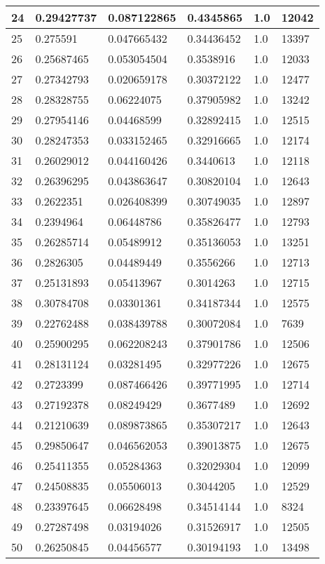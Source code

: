 \begin{longtable}{|l|l|l|l|l|l|}
24 & 0.29427737 & 0.087122865 & 0.4345865 & 1.0 & 12042 \\ \hline 
25 & 0.275591 & 0.047665432 & 0.34436452 & 1.0 & 13397 \\ \hline 
26 & 0.25687465 & 0.053054504 & 0.3538916 & 1.0 & 12033 \\ \hline 
27 & 0.27342793 & 0.020659178 & 0.30372122 & 1.0 & 12477 \\ \hline 
28 & 0.28328755 & 0.06224075 & 0.37905982 & 1.0 & 13242 \\ \hline 
29 & 0.27954146 & 0.04468599 & 0.32892415 & 1.0 & 12515 \\ \hline 
30 & 0.28247353 & 0.033152465 & 0.32916665 & 1.0 & 12174 \\ \hline 
31 & 0.26029012 & 0.044160426 & 0.3440613 & 1.0 & 12118 \\ \hline 
32 & 0.26396295 & 0.043863647 & 0.30820104 & 1.0 & 12643 \\ \hline 
33 & 0.2622351 & 0.026408399 & 0.30749035 & 1.0 & 12897 \\ \hline 
34 & 0.2394964 & 0.06448786 & 0.35826477 & 1.0 & 12793 \\ \hline 
35 & 0.26285714 & 0.05489912 & 0.35136053 & 1.0 & 13251 \\ \hline 
36 & 0.2826305 & 0.04489449 & 0.3556266 & 1.0 & 12713 \\ \hline 
37 & 0.25131893 & 0.05413967 & 0.3014263 & 1.0 & 12715 \\ \hline 
38 & 0.30784708 & 0.03301361 & 0.34187344 & 1.0 & 12575 \\ \hline 
39 & 0.22762488 & 0.038439788 & 0.30072084 & 1.0 & 7639 \\ \hline 
40 & 0.25900295 & 0.062208243 & 0.37901786 & 1.0 & 12506 \\ \hline 
41 & 0.28131124 & 0.03281495 & 0.32977226 & 1.0 & 12675 \\ \hline 
42 & 0.2723399 & 0.087466426 & 0.39771995 & 1.0 & 12714 \\ \hline 
43 & 0.27192378 & 0.08249429 & 0.3677489 & 1.0 & 12692 \\ \hline 
44 & 0.21210639 & 0.089873865 & 0.35307217 & 1.0 & 12643 \\ \hline 
45 & 0.29850647 & 0.046562053 & 0.39013875 & 1.0 & 12675 \\ \hline 
46 & 0.25411355 & 0.05284363 & 0.32029304 & 1.0 & 12099 \\ \hline 
47 & 0.24508835 & 0.05506013 & 0.3044205 & 1.0 & 12529 \\ \hline 
48 & 0.23397645 & 0.06628498 & 0.34514144 & 1.0 & 8324 \\ \hline 
49 & 0.27287498 & 0.03194026 & 0.31526917 & 1.0 & 12505 \\ \hline 
50 & 0.26250845 & 0.04456577 & 0.30194193 & 1.0 & 13498 \\ \hline 
\end{longtable}